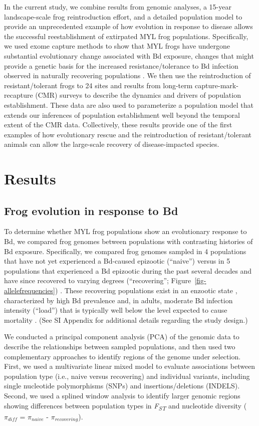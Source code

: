 \documentclass[9pt,twocolumn,twoside,lineno]{pnas-new}
\begin{document}
In the current study, we combine results from genomic analyses, a
15-year landscape-scale frog reintroduction effort, and a detailed
population model to provide an unprecedented example of how evolution in
response to disease allows the successful reestablishment of extirpated
MYL frog populations. Specifically, we used exome capture methods to
show that MYL frogs have undergone substantial evolutionary change
associated with Bd exposure, changes that might provide a genetic basis
for the increased resistance/tolerance to Bd infection observed in
naturally recovering populations \citep{knapp2016}. We then use the
reintroduction of resistant/tolerant frogs to 24 sites and results from
long-term capture-mark-recapture (CMR) surveys to describe the dynamics
and drivers of population establishment. These data are also used to
parameterize a population model that extends our inferences of
population establishment well beyond the temporal extent of the CMR
data. Collectively, these results provide one of the first examples of
how evolutionary rescue and the reintroduction of resistant/tolerant
animals can allow the large-scale recovery of disease-impacted species.

\section*{Results}

\subsection*{Frog evolution in response to Bd}

To determine whether MYL frog populations show an evolutionary response
to Bd, we compared frog genomes between populations with contrasting
histories of Bd exposure. Specifically, we compared frog genomes sampled
in 4 populations that have not yet experienced a Bd-caused epizootic
(``naive'') \citep{zhou2015} versus in 5 populations that experienced a
Bd epizootic during the past several decades and have since recovered to
varying degrees (``recovering''; Figure~\ref{fig-allelefrequencies})
\citep{knapp2016, vredenburg2010}. These recovering populations exist in
an enzootic state \citep{briggs2010}, characterized by high Bd
prevalence and, in adults, moderate Bd infection intensity (``load'')
that is typically well below the level expected to cause mortality
\citep{vredenburg2010}. (See SI Appendix for additional details
regarding the study design.)

We conducted a principal component analysis (PCA) of the genomic data to
describe the relationships between sampled populations, and then used
two complementary approaches to identify regions of the genome under
selection. First, we used a multivariate linear mixed model to evaluate
associations between population type (i.e., naive versus recovering) and
individual variants, including single nucleotide polymorphisms (SNPs)
and insertions/deletions (INDELS). Second, we used a splined window
analysis to identify larger genomic regions showing differences between
population types in \emph{F\textsubscript{ST}} and nucleotide diversity
(\(\pi_{diff}\) = \(\pi_{naive}\) - \(\pi_{recovering}\)).
\end{document}
